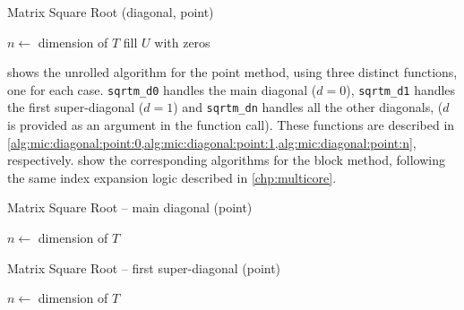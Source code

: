 \documentclass[../thesis]{subfiles}
\begin{document}
		\begin{algorithm}[htp]
			\caption[Matrix Square Root Unrolled (diagonal, point)]{Matrix Square Root (diagonal, point)}
			\label{alg:mic:diagonal:point}
			\DontPrintSemicolon



			$n \leftarrow$ dimension of $T$\;
			fill $U$ with zeros\;

			\;
			\;
		\end{algorithm}

		 shows the unrolled algorithm for the point method, using three distinct functions, one for each case. \texttt{sqrtm\_d0} handles the main diagonal ($d = 0$), \texttt{sqrtm\_d1} handles the first super-diagonal ($d = 1$) and \texttt{sqrtm\_dn} handles all the other diagonals, ($d$ is provided as an argument in the function call). These functions are described in \cref{alg:mic:diagonal:point:0,alg:mic:diagonal:point:1,alg:mic:diagonal:point:n}, respectively.  show the corresponding algorithms for the block method, following the same index expansion logic described in \cref{chp:multicore}.

		\begin{algorithm}[htp]
			\caption{Matrix Square Root -- main diagonal (point)}
			\label{alg:mic:diagonal:point:0}
			\DontPrintSemicolon


			$n \leftarrow$ dimension of $T$\;

		\end{algorithm}

		\begin{algorithm}[htp]
			\caption{Matrix Square Root -- first super-diagonal (point)}
			\label{alg:mic:diagonal:point:1}
			\DontPrintSemicolon


			$n \leftarrow$ dimension of $T$\;

		\end{algorithm}
\end{document}
